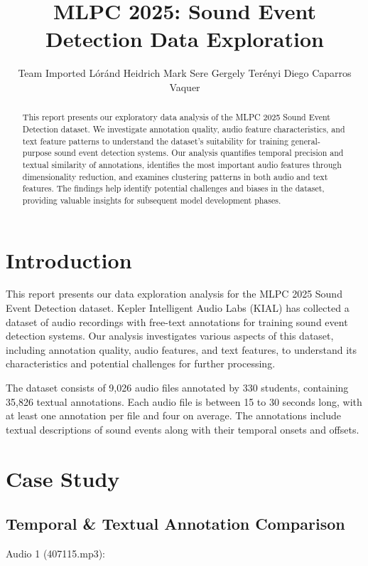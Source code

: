 \documentclass{article}
\title{MLPC 2025: Sound Event Detection Data Exploration}
\author{
  Team Imported \AND
  Lóránd Heidrich
  \And
  Mark Sere
  \And 
  Gergely Terényi
  \And 
  Diego Caparros Vaquer
}
\begin{document}
\maketitle

\begin{abstract}
This report presents our exploratory data analysis of the MLPC 2025 Sound Event Detection dataset. We investigate annotation quality, audio feature characteristics, and text feature patterns to understand the dataset's suitability for training general-purpose sound event detection systems. Our analysis quantifies temporal precision and textual similarity of annotations, identifies the most important audio features through dimensionality reduction, and examines clustering patterns in both audio and text features. The findings help identify potential challenges and biases in the dataset, providing valuable insights for subsequent model development phases.
\end{abstract}

\section{Introduction}

This report presents our data exploration analysis for the MLPC 2025 Sound Event Detection dataset. Kepler Intelligent Audio Labs (KIAL) has collected a dataset of audio recordings with free-text annotations for training sound event detection systems. Our analysis investigates various aspects of this dataset, including annotation quality, audio features, and text features, to understand its characteristics and potential challenges for further processing.

The dataset consists of 9,026 audio files annotated by 330 students, containing 35,826 textual annotations. Each audio file is between 15 to 30 seconds long, with at least one annotation per file and four on average. The annotations include textual descriptions of sound events along with their temporal onsets and offsets.

\section{Case Study}
\label{sec:case_study}

\subsection{Temporal & Textual Annotation Comparison}
Audio 1 (407115.mp3):
\end{document}
